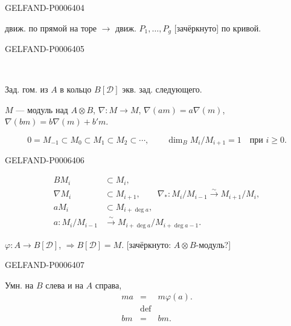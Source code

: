 \begin{GelfandAdjacentEvidence}{GELFAND-P000640}{4}


движ. по прямой на торе \(\to\) движ. \(P_1,\ldots,P_g\) [зачёркнуто] по кривой.
\end{GelfandAdjacentEvidence}
\begin{GelfandAdjacentEvidence}{GELFAND-P000640}{5}


\begin{center}\textemdash\,\textperiodcentered\,\textemdash\end{center}

Зад. гом. из \(A\) в кольцо \(B[\mathcal D]\) экв. зад. следующего.

\(M\) --- модуль над \(A\otimes B\),
\(\nabla:M\to M\), \(\nabla(am)=a\nabla(m)\),
\(\nabla(bm)=b\nabla(m)+b'm\).

\[
0=M_{-1}\subset M_0\subset M_1\subset M_2\subset\cdots,\qquad
\dim_B M_i/M_{i+1}=1\quad\text{при }i\geqslant0.
\]
\end{GelfandAdjacentEvidence}
\begin{GelfandAdjacentEvidence}{GELFAND-P000640}{6}

\[
\begin{aligned}
BM_i&\subset M_i,\\
\nabla M_i&\subset M_{i+1},\qquad
\nabla_*:M_i/M_{i-1}\overset{\sim}{\to}M_{i+1}/M_i,\\
aM_i&\subset M_{i+\operatorname{deg}a},\\
a:M_i/M_{i-1}&\overset{\sim}{\to}M_{i+\operatorname{deg}a}/M_{i+\operatorname{deg}a-1}.
\end{aligned}
\]

\begin{center}\textemdash\end{center}

\underline{\(\varphi:A\to B[\mathcal D]\)}, \(\Rightarrow B[\mathcal D]=M\).
[зачёркнуто: \(A\otimes B\)-модуль?]
\end{GelfandAdjacentEvidence}
\begin{GelfandAdjacentEvidence}{GELFAND-P000640}{7}


Умн. на \(B\) слева и на \(A\) справа,
\[
\begin{array}{rcl}
ma &=& m\varphi(a).\\[-.4ex]
   & \scriptstyle\mathrm{def} & \\[-.6ex]
bm &=& bm.
\end{array}
\]
\end{GelfandAdjacentEvidence}
